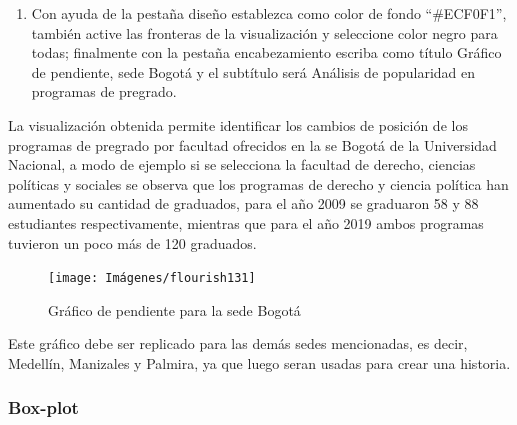 \documentclass[
]{book}
\providecommand{\tightlist}{%
  \setlength{\itemsep}{0pt}\setlength{\parskip}{0pt}}
\begin{document}
\begin{enumerate}
\def\labelenumi{\arabic{enumi}.}
\setcounter{enumi}{5}
\tightlist
\item
  Con ayuda de la pestaña diseño establezca como color de fondo ``\#ECF0F1'', también active las fronteras de la visualización y seleccione color negro para todas; finalmente con la pestaña encabezamiento escriba como título Gráfico de pendiente, sede Bogotá y el subtítulo será Análisis de popularidad en programas de pregrado.
\end{enumerate}

La visualización obtenida permite identificar los cambios de posición de los programas de pregrado por facultad ofrecidos en la se Bogotá de la Universidad Nacional, a modo de ejemplo si se selecciona la facultad de derecho, ciencias políticas y sociales se observa que los programas de derecho y ciencia política han aumentado su cantidad de graduados, para el año 2009 se graduaron 58 y 88 estudiantes respectivamente, mientras que para el año 2019 ambos programas tuvieron un poco más de 120 graduados.

\begin{figure}

{\centering \texttt{[image: Imágenes/flourish131]} 

}

\caption{Gráfico de pendiente para la sede Bogotá}\label{fig:pendientesedebogotaflourish-fig}
\end{figure}

Este gráfico debe ser replicado para las demás sedes mencionadas, es decir, Medellín, Manizales y Palmira, ya que luego seran usadas para crear una historia.

\hypertarget{boxplotflourish}{%
\subsubsection{Box-plot}\label{boxplotflourish}}
\end{document}
